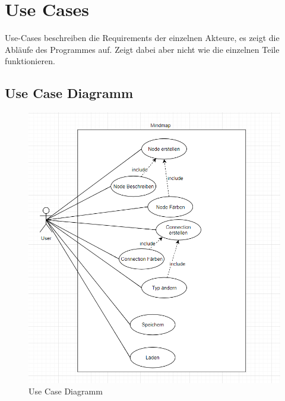 \section{Use Cases}
\label{sec:use_cases}
Use-Cases beschreiben die Requirements der einzelnen Akteure, es zeigt die Abläufe des Programmes auf. Zeigt dabei aber nicht wie die einzelnen Teile funktionieren.

\subsection{Use Case Diagramm}
\label{subsec:use_case_diagramm}

\begin{figure}[H]
	\centering
		\includegraphics[scale=0.7]{images/UseCaseDiagram.PNG}
	\caption{Use Case Diagramm}
	\label{fig:use_case_diagramm}
\end{figure}

